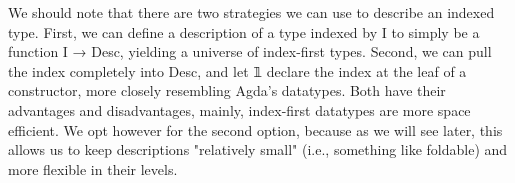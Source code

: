 We should note that there are two strategies we can use to describe an indexed type. First, we can define a description of a type indexed by I to simply be a function I → Desc, yielding a universe of index-first types. Second, we can pull the index completely into Desc, and let 𝟙 declare the index at the leaf of a constructor, more closely resembling Agda's datatypes. Both have their advantages and disadvantages, mainly, index-first datatypes are more space efficient. We opt however for the second option, because as we will see later, this allows us to keep descriptions "relatively small" (i.e., something like foldable) and more flexible in their levels.
\begin{code}[hide]%
\>[0]\AgdaSpace{}%
\AgdaSpace{}%
\<%
\\
\>[0][@{}l@{\AgdaIndent{0}}]%
\>[2]\AgdaSpace{}%
\<%
\\
\>[2][@{}l@{\AgdaIndent{0}}]%
\>[4]\AgdaSpace{}%
\AgdaSymbol{:}\AgdaSpace{}%
\<%
\end{code}
\begin{code}%
%
\>[2]\AgdaSpace{}%
\AgdaSpace{}%
\AgdaSymbol{(}\AgdaSpace{}%
\AgdaSymbol{:}\AgdaSpace{}%
\AgdaSymbol{)}\AgdaSpace{}%
\AgdaSymbol{:}\AgdaSpace{}%
\AgdaSpace{}%
\<%
\\
\>[2][@{}l@{\AgdaIndent{0}}]%
\>[4]%
\>[9]\AgdaSymbol{:}\AgdaSpace{}%
\AgdaSpace{}%
\AgdaSpace{}%
\AgdaSpace{}%
\<%
\\
%
\>[4]%
\>[9]\AgdaSymbol{:}\AgdaSpace{}%
\AgdaSpace{}%
\AgdaSpace{}%
\AgdaSpace{}%
\AgdaSpace{}%
\AgdaSpace{}%
\AgdaSpace{}%
\<%
\\
%
\>[4]%
\>[9]\AgdaSymbol{:}\AgdaSpace{}%
\AgdaSymbol{(}\AgdaSpace{}%
\AgdaSymbol{:}\AgdaSpace{}%
\AgdaSymbol{)}\AgdaSpace{}%
\AgdaSpace{}%
\AgdaSymbol{(}\AgdaSpace{}%
\AgdaSpace{}%
\AgdaSpace{}%
\AgdaSymbol{)}\AgdaSpace{}%
\AgdaSpace{}%
\AgdaSpace{}%
\<%
\\
%
\>[4]%
\>[9]\AgdaSymbol{:}\AgdaSpace{}%
\AgdaSpace{}%
\AgdaSpace{}%
\AgdaSpace{}%
\AgdaSpace{}%
\AgdaSpace{}%
\AgdaSpace{}%
\AgdaSpace{}%
\<%
\end{code}
